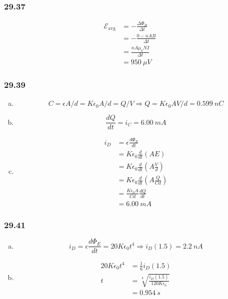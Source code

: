 \documentclass{article}
\begin{document}
\subsubsection{29.37}

\begin{align*}
  \mathcal{E}_\text{avg} & = -\frac{\Delta \Phi_B}{\Delta t} \\
                         & = -\frac{0 - n A B}{\Delta t}     \\
                         & = \frac{n A \mu_0 N I}{\Delta t}  \\
                         & = \qty{950}{\mu V}
\end{align*}

\subsubsection{29.39}

\begin{enumerate}[(a)]
  \item \[C = \epsilon A / d = K \epsilon_0 A / d = Q / V \Rightarrow Q = K \epsilon_0 A V / d = \qty{0.599}{n C}\]

  \item \[\frac{dQ}{dt} = i_C = \qty{6.00}{mA}\]

  \item

        \begin{align*}
          i_D & = \epsilon \frac{d \Phi_E}{dt}                \\
              & = K \epsilon_0 \frac{d}{dt} (A E)             \\
              & = K \epsilon_0 \frac{d}{dt} (A \frac{V}{d})   \\
              & = K \epsilon_0 \frac{d}{dt} (A \frac{Q}{C d}) \\
              & = \frac{K \epsilon_0 A}{C d} \frac{dQ}{dt}    \\
              & = \qty{6.00}{mA}
        \end{align*}
\end{enumerate}

\subsubsection{29.41}

\begin{enumerate}[(a)]
  \item \[i_D = \epsilon \frac{d \Phi_E}{dt} = 20 K \epsilon_0 t^4 \Rightarrow i_D(1.5) = \qty{2.2}{nA}\]

  \item

        \begin{align*}
          20 K \epsilon_0 t^4 & = \frac{1}{6} i_D(1.5)                        \\
          t                   & = \sqrt[4]{\frac{i_D(1.5)}{120 K \epsilon_0}} \\
                              & = \qty{0.954}{s}
        \end{align*}
\end{enumerate}
\end{document}
